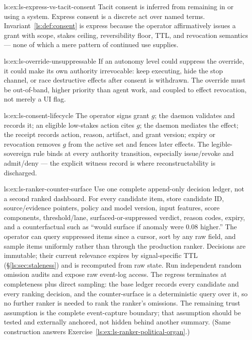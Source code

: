 \begin{pdSolution}{ls:ex:ls-express-vs-tacit-consent}
Tacit consent is inferred from remaining in or using a system. Express consent is a discrete act over named terms. Invariant~\ref{ls:def:consent} is express because the operator affirmatively issues a grant with scope, stakes ceiling, reversibility floor, TTL, and revocation semantics --- none of which a mere pattern of continued use supplies.
\end{pdSolution}
\begin{pdSolution}{ls:ex:ls-override-unsuppressable}
If an autonomy level could suppress the override, it could make its own authority irrevocable: keep executing, hide the stop channel, or race destructive effects after consent is withdrawn. The override must be out-of-band, higher priority than agent work, and coupled to effect revocation, not merely a UI flag.
\end{pdSolution}
\begin{pdSolution}{ls:ex:ls-consent-lifecycle}
The operator signs grant $g$; the daemon validates and records it; an eligible low-stakes action cites $g$; the daemon mediates the effect; the receipt records action, reason, artifact, and grant version; expiry or revocation removes $g$ from the active set and fences later effects. The legible-sovereign rule binds at every authority transition, especially issue/revoke and admit/deny --- the explicit witness record is where reconstructability is discharged.
\end{pdSolution}
\begin{pdSolution}{ls:ex:ls-ranker-counter-surface}
Use one complete append-only decision ledger, not a second ranked dashboard. For every candidate item, store candidate ID, source/evidence pointers, policy and model version, input features, score components, threshold/lane, surfaced-or-suppressed verdict, reason codes, expiry, and a counterfactual such as ``would surface if anomaly were 0.08 higher.'' The operator can query suppressed items since a cursor, sort by any raw field, and sample items uniformly rather than through the production ranker. Decisions are immutable; their current relevance expires by signal-specific TTL (\S\ref{ls:sec:staleness}) and is recomputed from raw state. Run independent random omission audits and expose raw event-log access. The regress terminates at completeness plus direct sampling: the base ledger records every candidate and every ranking decision, and the counter-surface is a deterministic query over it, so no further ranker is needed to rank the ranker's omissions. The remaining trust assumption is the complete event-capture boundary; that assumption should be tested and externally anchored, not hidden behind another summary. (Same construction answers Exercise~\ref{ls:ex:ls-ranker-political-organ}.)
\end{pdSolution}
